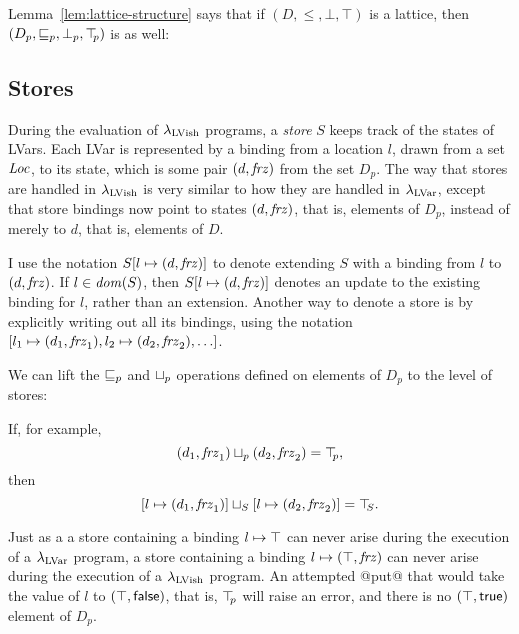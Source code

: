 \DefLatticeWithStatusBits

\LemPartitionOfDp

\DefLubP

Lemma~\ref{lem:lattice-structure} says that if $(D, \leq, \bot, \top)$
is a lattice, then $(D_p, \sqsubseteq_p, \bot_{p}, \top\hspace{-0.85mm}_{p})$ is as well:

\LemLatticeStructure


\subsection{Stores}

During the evaluation of $\lambda_{\textrm{LVish}}$ programs, a \emph{store} $S$
keeps track of the states of LVars.  Each LVar is represented by a
binding from a location $l$, drawn from a set $\mathit{Loc}$, to its state,
which is some pair $(d, \mathit{frz})$ from the set $D_p$.  The way
that stores are handled in $\lambda_{\textrm{LVish}}$ is very similar to how they
are handled in $\lambda_{\textrm{LVar}}$, except that store bindings now point to
states $(d, \mathit{frz})$, that is, elements of $D_p$, instead of
merely to $d$, that is, elements of $D$.

\DefStore

I use the notation $S[l \mapsto (d, \mathit{frz})]$ to denote extending $S$
with a binding from $l$ to $(d, \mathit{frz})$.  If $l \in \mathit{dom}(S)$,
then $S[l \mapsto (d, \mathit{frz})]$ denotes an update to the existing
binding for $l$, rather than an extension.  Another way to denote a
store is by explicitly writing out all its bindings, using the
notation $\store{\storebinding{l_1}{d_1}{\status_1},
  \storebinding{l_2}{d_2}{\status_2}, \dots}$.

We can lift the $\sqsubseteq_p$ and $ \sqcup_p $ operations defined on elements
of $D_p$ to the level of stores:

\DefLeqStore

\DefLubStore

If, for example,
\[ (d_1, \mathit{frz}_1) \sqcup_p (d_2, \mathit{frz}_2) = \top\hspace{-0.85mm}_{p}, \]
then
\[ \left[ l \mapsto (d_1, \mathit{frz}_1) \right] \sqcup_{S} \left[ l \mapsto (d_2, \mathit{frz}_2) \right] =
\top\hspace{-0.85mm}_{S}. \]

Just as a a store containing a binding $l \mapsto \top$ can
never arise during the execution of a $\lambda_{\textrm{LVar}}$ program, a store
containing a binding $l \mapsto (\top, \mathit{frz})$ can never arise
during the execution of a $\lambda_{\textrm{LVish}}$ program. An attempted @put@
that would take the value of $l$ to $(\top, \textsf{false})$, that
is, $\top\hspace{-0.85mm}_{p}$ will raise an error, and there is no
$(\top, \textsf{true})$ element of $D_p$.

